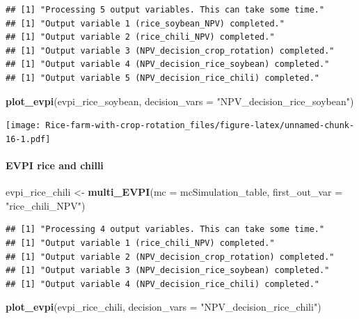 \documentclass[
]{article}
\newenvironment{Shaded}{\begin{snugshade}}{\end{snugshade}}
\newcommand{\AttributeTok}[1]{\textcolor[rgb]{0.13,0.29,0.53}{#1}}
\newcommand{\FunctionTok}[1]{\textcolor[rgb]{0.13,0.29,0.53}{\textbf{#1}}}
\newcommand{\NormalTok}[1]{#1}
\newcommand{\OtherTok}[1]{\textcolor[rgb]{0.56,0.35,0.01}{#1}}
\newcommand{\StringTok}[1]{\textcolor[rgb]{0.31,0.60,0.02}{#1}}
\begin{document}
\begin{verbatim}
## [1] "Processing 5 output variables. This can take some time."
## [1] "Output variable 1 (rice_soybean_NPV) completed."
## [1] "Output variable 2 (rice_chili_NPV) completed."
## [1] "Output variable 3 (NPV_decision_crop_rotation) completed."
## [1] "Output variable 4 (NPV_decision_rice_soybean) completed."
## [1] "Output variable 5 (NPV_decision_rice_chili) completed."
\end{verbatim}

\begin{Shaded}
\begin{Highlighting}[]
\FunctionTok{plot\_evpi}\NormalTok{(evpi\_rice\_soybean, }\AttributeTok{decision\_vars =} \StringTok{"NPV\_decision\_rice\_soybean"}\NormalTok{)}
\end{Highlighting}
\end{Shaded}

\texttt{[image: Rice-farm-with-crop-rotation\_files/figure-latex/unnamed-chunk-16-1.pdf]}

\hypertarget{evpi-rice-and-chilli}{%
\paragraph{EVPI rice and chilli}\label{evpi-rice-and-chilli}}

\begin{Shaded}
\begin{Highlighting}[]
\NormalTok{evpi\_rice\_chili }\OtherTok{\textless{}{-}} \FunctionTok{multi\_EVPI}\NormalTok{(}\AttributeTok{mc =}\NormalTok{ mcSimulation\_table, }\AttributeTok{first\_out\_var =} \StringTok{"rice\_chili\_NPV"}\NormalTok{)}
\end{Highlighting}
\end{Shaded}

\begin{verbatim}
## [1] "Processing 4 output variables. This can take some time."
## [1] "Output variable 1 (rice_chili_NPV) completed."
## [1] "Output variable 2 (NPV_decision_crop_rotation) completed."
## [1] "Output variable 3 (NPV_decision_rice_soybean) completed."
## [1] "Output variable 4 (NPV_decision_rice_chili) completed."
\end{verbatim}

\begin{Shaded}
\begin{Highlighting}[]
\FunctionTok{plot\_evpi}\NormalTok{(evpi\_rice\_chili, }\AttributeTok{decision\_vars =} \StringTok{"NPV\_decision\_rice\_chili"}\NormalTok{)}
\end{Highlighting}
\end{Shaded}
\end{document}
